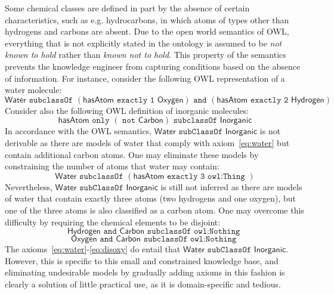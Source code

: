 \documentclass[10pt]{bmc_article}
\newenvironment{bmcformat}{\baselineskip20pt\sloppy\setboolean{publ}{false}}{\baselineskip20pt\sloppy}
\begin{document}
\begin{bmcformat}
Some chemical classes are defined in part by the absence of certain characteristics, such as e.g. hydrocarbons, in which atoms of types other than hydrogens and carbons are absent. Due to the open world semantics of OWL, everything that is not explicitly stated in the ontology is assumed to be \emph{not known to hold} rather than \emph{known not to hold}. This property of the semantics prevents the knowledge engineer from capturing conditions based on the absence of information. For instance, consider the following OWL representation of a water molecule:
%
\begin{equation}
\label{eq:water}
\mathsf{Water \texttt{ subclassOf } (hasAtom \texttt{ exactly 1 } Oxygen) \texttt{ and } (hasAtom \texttt{ exactly 2 } Hydrogen)}
\end{equation}
%
Consider also the following OWL definition of inorganic molecules:
\begin{equation}
\label{eq:inorganic}
\mathsf{hasAtom \texttt{ only }(\texttt{ not } Carbon) \texttt{ subclassOf } Inorganic}
\end{equation}
In accordance with the OWL semantics, $\mathsf{Water} \texttt{ subClassOf } \mathsf{Inorganic}$ is not derivable as there are models of water that comply with axiom~\eqref{eq:water} but contain additional carbon atoms. One may eliminate these models by constraining the number of atoms that water may contain:
\begin{equation}
\label{eq:three}
\mathsf{Water \texttt{ subclassOf } (hasAtom \texttt{ exactly 3 owl:Thing } ) }
\end{equation}
%
Nevertheless, $\mathsf{Water} \texttt{ subClassOf } \mathsf{Inorganic}$  is still not inferred as there are models of water that contain exactly three atoms (two hydrogens and one oxygen), but one of the three atoms is also classified as a carbon atom. One may overcome this difficulty by requiring the chemical elements to be disjoint:
\begin{equation}
\label{eq:dishyd}
\mathsf{Hydrogen \texttt{ and } Carbon \texttt{ subclassOf owl:Nothing } }
\end{equation}
\begin{equation}
\label{eq:disoxy}
\mathsf{Oxygen \texttt{ and } Carbon \texttt{ subclassOf owl:Nothing } }
\end{equation}
The axioms~\eqref{eq:water}-\eqref{eq:disoxy} do entail that $\mathsf{Water} \texttt{ subClassOf } \mathsf{Inorganic}$. However, this is specific to this small and constrained knowledge base, and eliminating undesirable models by gradually adding axioms in this fashion is clearly a solution of little practical use, as it is domain-specific and tedious.


\end{bmcformat}
\end{document}
